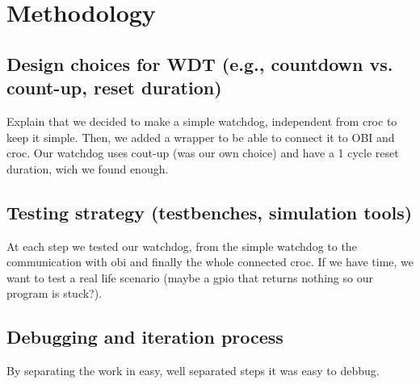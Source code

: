 

\chapter{Methodology}
\label{chap:methodology}

\section{Design choices for WDT (e.g., countdown vs. count-up, reset duration)}
Explain that we decided to make a simple watchdog, independent from croc to keep it simple.
Then, we added a wrapper to be able to connect it to OBI and croc.
Our watchdog uses cout-up (was our own choice) and have a 1 cycle reset duration, 
wich we found enough.

\section{Testing strategy (testbenches, simulation tools)}
At each step we tested our watchdog, from the simple watchdog to the communication with obi and finally the whole connected croc.
If we have time, we want to test a real life scenario (maybe a gpio that returns nothing so our program is stuck?).

\section{Debugging and iteration process}
By separating the work in easy, well separated steps it was easy to debbug.

